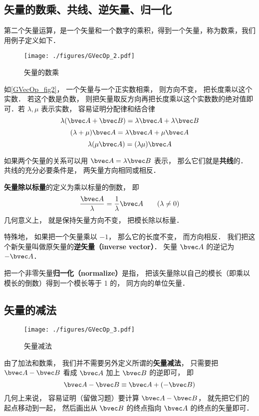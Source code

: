 \subsection{矢量的数乘、共线、逆矢量、归一化}\label{GVecOp_sub1}
第二个矢量运算，是一个矢量和一个数字的乘积，得到一个矢量，称为数乘，我们用例子定义如下．

\begin{figure}[ht]
\centering
\texttt{[image: ./figures/GVecOp\_2.pdf]}
\caption{矢量的数乘} \label{GVecOp_fig2}
\end{figure}

如\autoref{GVecOp_fig2}， 一个矢量与一个正实数相乘， 则方向不变， 把长度乘以这个实数． 若这个数是负数， 则把矢量取反方向再把长度乘以这个实数数的绝对值即可．若 $\lambda, \mu$ 表示实数， 容易证明分配律和结合律
\begin{equation}
\lambda(\bvec A + \bvec B) = \lambda\bvec A + \lambda\bvec B
\end{equation}
\begin{equation}
(\lambda+\mu)\bvec A = \lambda\bvec A + \mu\bvec A
\end{equation}
\begin{equation}
\lambda(\mu\bvec A) = (\lambda\mu) \bvec A
\end{equation}

如果两个矢量的关系可以用 $\bvec A = \lambda\bvec B$ 表示， 那么它们就是\textbf{共线}的． 共线的充分必要条件是， 两矢量方向相同或相反．

\textbf{矢量除以标量}的定义为乘以标量的倒数， 即
\begin{equation}
\frac{\bvec A}{\lambda} = \frac{1}{\lambda} \bvec A \qquad (\lambda \ne 0)
\end{equation}
几何意义上， 就是保持矢量方向不变， 把模长除以标量．

特殊地， 如果把一个矢量乘以 $-1$， 那么它的长度不变， 而方向相反． 我们把这个新矢量叫做原矢量的\textbf{逆矢量（inverse vector）}． 矢量 $\bvec A$ 的逆记为 $-\bvec A$．

把一个非零矢量\textbf{归一化（normalize）}是指， 把该矢量除以自己的模长（即乘以模长的倒数）得到一个模长等于 1 的， 同方向的单位矢量．

\subsection{矢量的减法}

\begin{figure}[ht]
\centering
\texttt{[image: ./figures/GVecOp\_3.pdf]}
\caption{矢量减法} \label{GVecOp_fig3}
\end{figure}
由了加法和数乘， 我们并不需要另外定义所谓的\textbf{矢量减法}， 只需要把 $\bvec A - \bvec B$ 看成 $\bvec A$ 加上 $\bvec B$ 的逆即可， 即
\begin{equation}
\bvec A - \bvec B \equiv \bvec A + (-\bvec B)
\end{equation}
几何上来说， 容易证明（留做习题）要计算 $\bvec A - \bvec B$， 就先把它们的起点移动到一起， 然后画出从 $\bvec B$ 的终点指向 $\bvec A$ 的终点的矢量即可．

